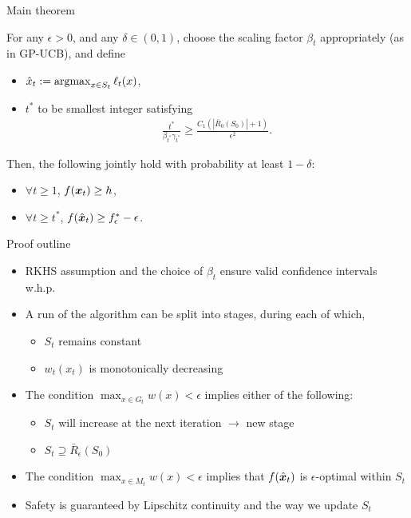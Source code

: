 \documentclass[10pt,mathserif]{beamer}
\newcommand{\LLC}{$L$-Lipschitz continuous}
\newcommand{\Rbeps}{\bar{R}_{\epsilon}}
\newcommand{\Rbo}{\bar{R}_{0}}
\newcommand{\xb}{\hat{\*x}}
\begin{document}
\begin{frame}{Main theorem}

For any $\epsilon > 0$, and any $\delta \in (0, 1)$, choose the scaling factor $\beta_t$ appropriately (as in GP-UCB), and define
\begin{itemize}
\item $\hat{x}_t := \argmax_{x \in S_t} \ell_t(x)$,
\item $t^*$ to be smallest integer satisfying
  \begin{align*}
  \frac{t^*}{\beta_{t^*} \gamma_{t^*}} \geq \frac{C_1 \left(|\Rbo(S_0)| + 1\right)}{\epsilon^2}.
  \end{align*}
\end{itemize}
Then, the following jointly hold with probability at least $1-\delta$:
\begin{itemize}
  \item $\forall t \geq 1$, $f(\bm{x}_t) \geq h$,
  \item $\forall t \geq t^*$, $f(\xb_t) \geq f^*_{\epsilon} - \epsilon$.
\end{itemize}
\end{frame}

\begin{frame}{Proof outline}
\begin{itemize}
\item RKHS assumption and the choice of $\beta_t$ ensure valid confidence intervals w.h.p.
\vspace{1em}
\item A run of the algorithm can be split into stages, during each of which,
  \begin{itemize}
    \item $S_t$ remains constant
    \item $w_t(x_t)$ is monotonically decreasing
  \end{itemize}
\vspace{1em}
\item The condition $\max_{x\in G_t} w(x) < \epsilon$ implies either of the following:
  \begin{itemize}
    \item $S_t$ will increase at the next iteration $\rightarrow$ new stage
    \item $S_t \supseteq \Rbeps(S_0)$
  \end{itemize}
\vspace{1em}
\item The condition $\max_{x\in M_t} w(x) < \epsilon$ implies that $f(\xb_t)$ is $\epsilon$-optimal within $S_t$
\vspace{1em}
\item Safety is guaranteed by Lipschitz continuity and the way we update $S_t$
\end{itemize}
\end{frame}
\end{document}
